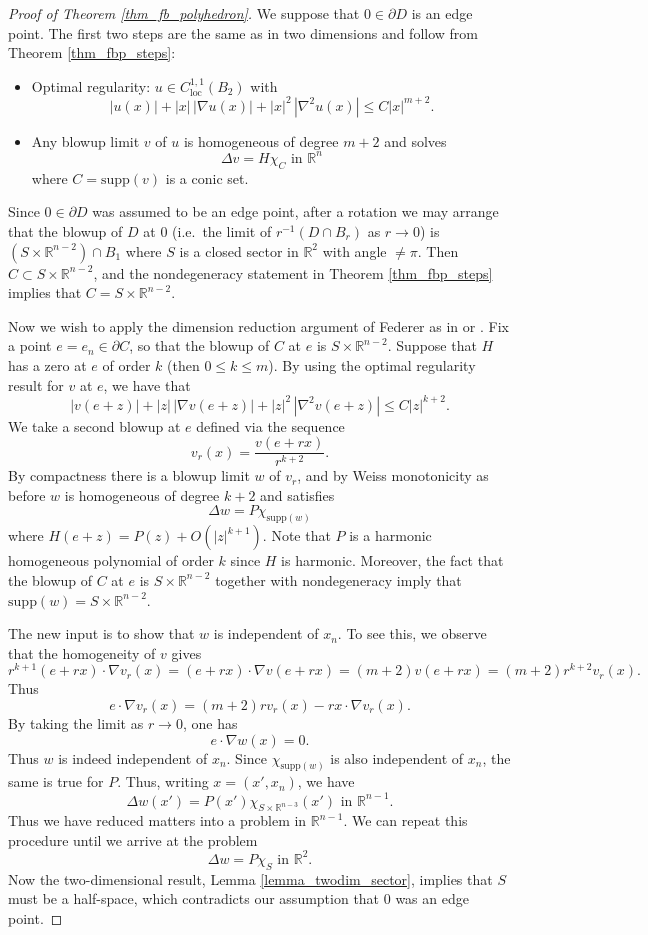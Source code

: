 \documentclass[11pt,a4paper]{amsart}
\theoremstyle{definition}
\numberwithin{equation}{section}
\newcommand{\mR}{\mathbb{R}}                    %
\newcommand{\supp}{\mathrm{supp}}
\newcommand{\p}{\partial}
\begin{document}
\begin{proof}[Proof of Theorem \ref{thm_fb_polyhedron}]
We suppose that $0 \in \p D$ is an edge point. The first two steps are the same as in two dimensions and follow from Theorem \ref{thm_fbp_steps}:
\begin{itemize}
\item 
Optimal regularity: $u \in C^{1,1}_{\mathrm{loc}}(B_2)$ with 
\[
|u(x)| + |x| \,|\nabla u(x)| + |x|^2 \, |\nabla^2 u(x)| \leq C |x|^{m+2}.
\]
\item 
Any blowup limit $v$ of $u$ is homogeneous of degree $m+2$ and solves 
\[
\Delta v = H \chi_{C} \text{ in $\mR^n$}
\]
where $C =  \supp(v)$ is a conic set.
\end{itemize}
Since $0 \in \p D$ was assumed to be an edge point, after a rotation we may arrange that the blowup of $D$ at $0$ (i.e.\ the limit of $r^{-1}(D \cap B_r)$ as $r \to 0$) is $(S \times \mR^{n-2}) \cap B_1$ where $S$ is a closed sector in $\mR^2$ with angle $\neq \pi$. Then $C \subset S \times \mR^{n-2}$, and the nondegeneracy statement in Theorem \ref{thm_fbp_steps} implies that $C = S \times \mR^{n-2}$.


Now we wish to apply the dimension reduction argument of Federer as in \cite{Weiss1999} or \cite[Lemma 10.9]{Velichkov2023}. Fix a point $e = e_n \in \p C$, so that the blowup of $C$ at $e$ is $S \times \mR^{n-2}$. Suppose that $H$ has a zero at $e$ of order $k$ (then $0 \leq k \leq m$). By using the optimal regularity result for $v$ at $e$, we have that 
\[
|v(e+z)| + |z| \,|\nabla v(e+z)| + |z|^2 \, |\nabla^2 v(e+z)| \leq C |z|^{k+2}.
\]
We take a second blowup at $e$ defined via the sequence 
\[
v_r(x) = \frac{v(e + rx)}{r^{k+2}}.
\]
By compactness there is a blowup limit $w$ of $v_r$, and by Weiss monotonicity as before $w$ is homogeneous of degree $k+2$ and satisfies 
\[
\Delta w = P \chi_{\mathrm{supp}(w)}
\]
where $H(e+z) = P(z) + O(|z|^{k+1})$. Note that $P$ is a harmonic homogeneous polynomial of order $k$ since $H$ is harmonic. Moreover, the fact that the blowup of $C$ at $e$ is $S \times \mR^{n-2}$ together with nondegeneracy imply that $\mathrm{supp}(w) = S \times \mR^{n-2}$.

The new input is to show that $w$ is independent of $x_n$. To see this, we observe that the homogeneity of $v$ gives 
\[
r^{k+1} (e+rx) \cdot \nabla v_r(x) = (e+rx) \cdot \nabla v(e+rx) = (m+2) v(e+rx) = (m+2) r^{k+2} v_r(x).
\]
Thus 
\[
e \cdot \nabla v_r(x) = (m+2) r v_r(x) - rx \cdot \nabla v_r(x).
\]
By taking the limit as $r \to 0$, one has 
\[
e \cdot \nabla w(x) = 0.
\]
Thus $w$ is indeed independent of $x_n$. Since $\chi_{\mathrm{supp}(w)}$ is also independent of $x_n$, the same is true for $P$. Thus, writing $x = (x',x_n)$, we have 
\[
\Delta w(x') = P(x') \chi_{S \times \mR^{n-3}}(x') \text{ in $\mR^{n-1}$}.
\]
Thus we have reduced matters into a problem in $\mR^{n-1}$. We can repeat this procedure until we arrive at the problem 
\[
\Delta w = P \chi_{S} \text{ in $\mR^2$}.
\]
Now the two-dimensional result, Lemma \ref{lemma_twodim_sector}, implies that $S$ must be a half-space, which contradicts our assumption that $0$ was an edge point.
\end{proof}
\end{document}
